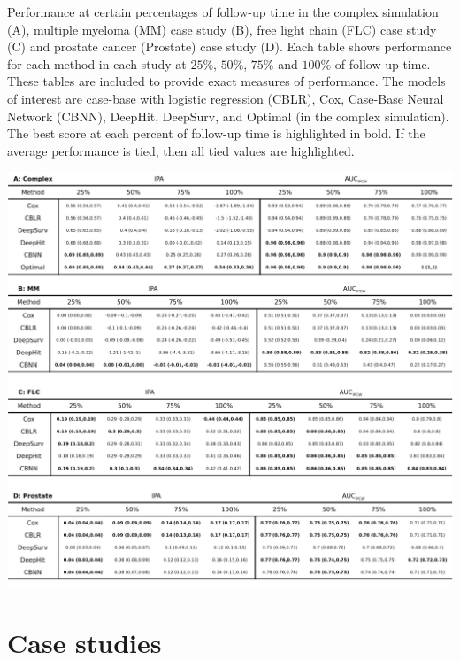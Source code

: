 \documentclass[preprint,12pt]{elsarticle}
\begin{document}
\begin{table}[!htbp]
\caption{Performance at certain percentages of follow-up time in the complex simulation (A), multiple myeloma (MM) case study (B), free light chain (FLC)
case study (C) and prostate cancer (Prostate) case study (D). Each table shows performance for each method in each study at $25\%$, $50\%$, $75\%$
and $100\%$ of follow-up time. These tables are included to
provide exact measures of performance. The models of interest are case-base with logistic regression (CBLR), Cox, Case-Base Neural Network (CBNN),
DeepHit, DeepSurv, and Optimal (in the complex simulation). The best score at each percent of follow-up time is highlighted in bold. If the average performance
is tied, then all tied values are highlighted.}
\label{tab:megaTable}

\begin{center}\includegraphics[width=1\linewidth]{figures/Table2.pdf} \end{center}

\end{table}



\hypertarget{casestudies}{%
\section{Case studies}\label{casestudies}}
\end{document}

